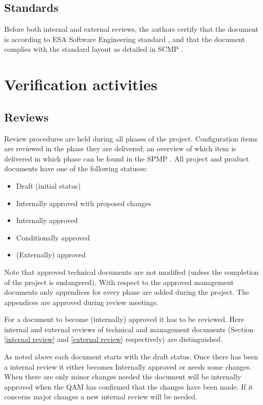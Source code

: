 \documentclass[%
		pathtobase=..,%
		titlefull={Software Validation and Verification Plan},%
		titleabbr=SVVP,%
		version=0.1]{fingerpaint}
\begin{document}
\section{Standards}
Before both internal and external reviews, the authors certify that the document is according to
ESA Software Engineering standard \cite{esa}, and that the document complies with the standard layout
as detailed in SCMP \cite{scmp}.

\chapter{Verification activities} \label{verificationactivities}
\section{Reviews}
    Review procedures are held during all phases of the \projectname project. Configuration items are reviewed in the phase they are delivered; an overview of which item is delivered in which phase can be found in the SPMP \cite{spmp}. All project and product documents have one of the following statuses:
\begin{itemize}
\item Draft (initial status)
\item Internally approved with proposed changes
\item Internally approved
\item Conditionally approved
\item (Externally) approved
\end{itemize}
Note that approved technical documents are not modified (unless the completion of the project is endangered). With respect to the approved management documents only appendices for every phase are added during the project. The appendices are approved during review meetings.

For a document to become (internally) approved it has to be reviewed. Here internal and external reviews of technical and management documents (Section \ref{internal review} and \ref{external review} respectively) are distinguished.

As noted above each document starts with the draft status. Once there has been a internal review it either becomes Internally approved or needs some changes. When there are only minor changes needed the document will be internally approved when the QAM has confirmed that the changes have been made. If it concerns major changes a new internal review will be needed.
\end{document}
